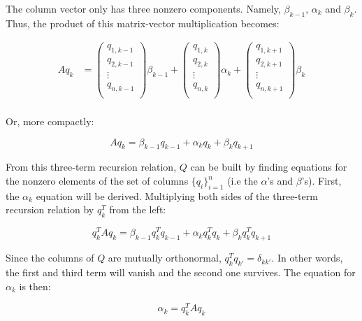 The column vector only has three nonzero components. Namely, $\beta_{k-1}$, $\alpha_{k}$ and $\beta_{k}$. Thus, the product of this matrix-vector multiplication becomes:

\[ \begin{aligned}
A q_k &= \begin{pmatrix}
q_{1,k-1} \\
q_{2,k-1} \\
\vdots \\
q_{n,k-1} \\
\end{pmatrix} \beta_{k-1} + 
\begin{pmatrix}
q_{1,k} \\
q_{2,k} \\
\vdots \\
q_{n,k} \\
\end{pmatrix} \alpha_{k} +
\begin{pmatrix}
q_{1,k+1} \\
q_{2,k+1} \\
\vdots \\
q_{n,k+1} \\
\end{pmatrix} \beta_{k} \\
\end{aligned}\]

Or, more compactly:

\begin{equation}
A q_{k} = \beta_{k-1} q_{k-1} + \alpha_{k} q_{k} + \beta_{k} q_{k+1}
\end{equation}

From this three-term recursion relation, $Q$ can be built by finding equations for the nonzero elements of the set of columns $\lbrace q_i \rbrace_{i=1}^{n}$ (i.e the $\alpha$'s and $\beta$'s). First, the $\alpha_k$ equation will be derived. Multiplying both sides of the three-term recursion relation by $q_{k}^{T}$ from the left:

\[ q_{k}^{T} A q_{k} = \beta_{k-1} q_{k}^{T}q_{k-1} + \alpha_{k} q_{k}^{T} q_{k} + \beta_{k} q_{k}^{T} q_{k+1}  \]

Since the columns of $Q$ are mutually orthonormal, $q_{k}^{T}q_{k'} = \delta_{kk'}$. In other words, the first and third term will vanish and the second one survives. The equation for $\alpha_{k}$ is then:

\begin{equation} 
\alpha_{k} = q_{k}^{T} A q_{k}
\end{equation}

